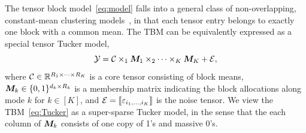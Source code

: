 \documentclass{article}
\begin{document}
The tensor block model~\eqref{eq:model} falls into a general class of non-overlapping, constant-mean clustering models~\cite{madeira2004biclustering}, in that each tensor entry belongs to exactly one block with a common mean. The TBM can be equivalently expressed as a special tensor Tucker model,
\begin{equation}\label{eq:Tucker}
\mathcal{Y}=\mathcal{C}\times_1\boldsymbol{M}_1\times_2\cdots \times_K \boldsymbol{M}_K+\mathcal{E},
\end{equation}
where $\mathcal{C}\in\mathbb{R}^{R_1\times\cdots\times R_K}$ is a core tensor consisting of block means, $\boldsymbol{M}_k \in\{0,1\}^{d_k\times R_k}$ is a membership matrix indicating the block allocations along mode $k$ for $k\in[K]$, and $\mathcal{E}=\llbracket \varepsilon_{i_1,\ldots,i_K} \rrbracket$ is the noise tensor. %
We view the TBM~\eqref{eq:Tucker} as a super-sparse Tucker model, in the sense that the each column of $\boldsymbol{M}_k$ consists of one copy of 1's and massive 0's. 
\end{document}
